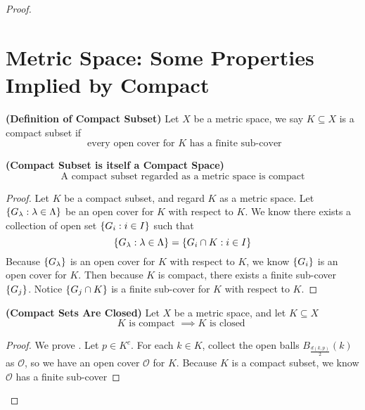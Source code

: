 \documentclass{report}
\begin{document}
\begin{proof}
\section{Metric Space: Some Properties Implied by Compact}
\begin{definition}
\label{3.6.1}
\textbf{(Definition of Compact Subset)} Let $X$ be a metric space, we say  $K\subseteq X$ is a compact subset if
\begin{equation}
\text{ every open cover for $K$ has a finite sub-cover}
\end{equation}
\end{definition}
\begin{theorem}
\label{3.6.2}
\textbf{(Compact Subset is itself a Compact Space)} 
\begin{equation}
\text{ A compact subset regarded as a metric space is compact }
\end{equation}
\end{theorem}
\begin{proof}
Let $K$ be a compact subset, and regard  $K$ as a metric space. Let $\{ G_\lambda :\lambda \in \Lambda  \}$ be an open cover for $K$ with respect to $K$. We know there exists a collection of open set $\{ G_i:i\in I \}$ such that 
\begin{equation}
\{ G_\lambda: \lambda  \in \Lambda \}=\{ G_i\cap K: i\in I \}
\end{equation}
Because $\{ G_\lambda  \}$ is an open cover for $K$ with respect to  $K$, we know  $\{ G_i \}$ is an open cover for $K$.  Then because $K$ is compact, there exists a finite sub-cover  $\{ G_j \}$. Notice $\{ G_j\cap K \}$ is a finite sub-cover for $K$ with respect to  $K$.
\end{proof}
\begin{theorem}
\label{3.6.3}
\textbf{(Compact Sets Are Closed)} Let $X$ be a metric space, and let $K\subseteq X$
\begin{equation}
K\text{ is compact }\implies K\text{ is closed }
\end{equation}
\end{theorem}
\begin{proof}
We prove  . Let $p\in K^c$. For each $k\in K$, collect the open balls $B_{\frac{d(k,p)}{2}}(k)$ as $\mathcal{O}$, so we have an open cover $\mathcal{O}$ for $K$. Because  $K$ is a compact subset, we know $\mathcal{O}$ has a finite sub-cover

\end{proof}
\end{proof}
\end{document}
